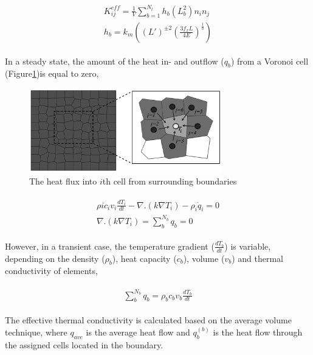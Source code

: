 \begin{align}
\label{eq:LEM_Thermal_1}
\begin{split}  
K_{ij}^{eff}=\frac{1}{V}\sum_{b=1}^{N_t}{h_b(L_b^2)n_i n_j}
\\
h_b = k_m \left( (L')^{\pm2} \left(\frac{3f_xL}{4E}\right)^\frac{1}{3} \right)
\end{split}
\end{align}        

In a steady state, the amount of the heat in- and outflow ($q_b$) from a Voronoi cell (Figure\ref{fig:Amir_LEM_Thermal})is equal to zero,

\begin{figure}[!ht]
\centering
\includegraphics[width=0.75\textwidth]{figures/Amir_LEM_Thermal.png}
\caption{The heat flux into $i$th cell from surrounding boundaries}
\label{fig:Amir_LEM_Thermal}
\end{figure}

\begin{align}
\label{eq:LEM_Thermal_2}
\begin{split}  
\rho ic_iv_i\frac{dT_i}{dt}-\nabla .\left(k\nabla T_i\right)-\rho_i{\dot{q}}_i=0\\
\nabla .\left(k\nabla T_i\right)=\sum_{b}^{N_b}{q_b=0}
\end{split}
\end{align}     
 
However, in a transient case, the temperature gradient ($\frac{dT_b}{dt}$) is variable, depending on the density ($\rho_b$), heat capacity ($c_b$), volume ($v_b$) and thermal conductivity of elements,

\begin{align}
\label{eq:LEM_Thermal_3}
\begin{split}  
\sum_{b}^{N_b}{q_b=}\rho_bc_bv_b\frac{dT_b}{dt}
\end{split}
\end{align}     

The effective thermal conductivity is calculated based on the average volume technique, where $q_{ave}$ is the average heat flow and $q_b^{(b)}$ is the heat flow through the assigned cells located in the boundary. 

